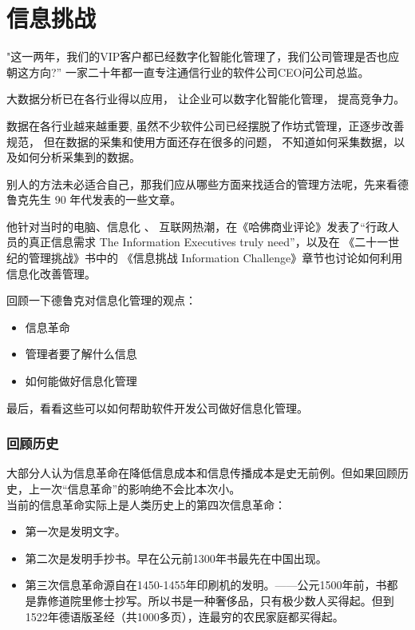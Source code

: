 \chapter[再读德鲁克]{信息挑战}  %

"这一两年，我们的VIP客户都已经数字化智能化管理了，我们公司管理是否也应朝这方向?''
一家二十年都一直专注通信行业的软件公司CEO问公司总监。

大数据分析已在各行业得以应用， 让企业可以数字化智能化管理， 提高竞争力。

数据在各行业越来越重要,
虽然不少软件公司已经摆脱了作坊式管理，正逐步改善规范，
但在数据的采集和使用方面还存在很多的问题，
不知道如何采集数据，以及如何分析采集到的数据。

别人的方法未必适合自己，那我们应从哪些方面来找适合的管理方法呢，先来看德鲁克先生
90 年代发表的一些文章。

他针对当时的电脑、信息化 、
互联网热潮，在《哈佛商业评论》发表了``行政人员的真正信息需求 The
Information Executives truly need''，以及在
《二十一世纪的管理挑战》书中的 《信息挑战 Information
Challenge》章节也讨论如何利用信息化改善管理。

回顾一下德鲁克对信息化管理的观点：

\begin{itemize}
\tightlist
\item
  信息革命
\item
  管理者要了解什么信息
\item
  如何能做好信息化管理
\end{itemize}

最后，看看这些可以如何帮助软件开发公司做好信息化管理。

\hypertarget{ux56deux987eux5386ux53f2}{%
\subsection{回顾历史}\label{ux56deux987eux5386ux53f2}}

大部分人认为信息革命在降低信息成本和信息传播成本是史无前例。但如果回顾历史，上一次``信息革命''的影响绝不会比本次小。\\
当前的信息革命实际上是人类历史上的第四次信息革命：

\begin{itemize}
\tightlist
\item
  第一次是发明文字。
\item
  第二次是发明手抄书。早在公元前1300年书最先在中国出现。
\item
  第三次信息革命源自在1450-1455年印刷机的发明。------公元1500年前，书都是靠修道院里修士抄写。所以书是一种奢侈品，只有极少数人买得起。但到1522年德语版圣经（共1000多页），连最穷的农民家庭都买得起。
\end{itemize}

